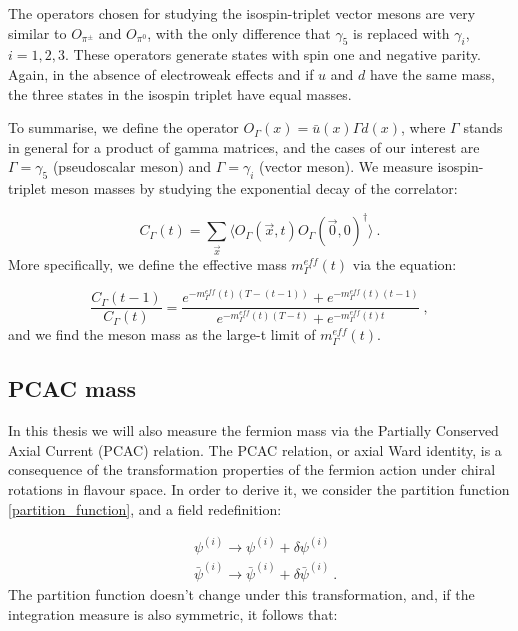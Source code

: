The operators chosen for studying the isospin-triplet vector mesons are very similar to $O_{\pi^{\pm}}$ and $O_{\pi^0}$, with the only difference that $\gamma_5$ is replaced with $\gamma_i$, $i = 1, 2, 3$. These operators generate states with spin one and negative parity. Again, in the absence of electroweak effects and if $u$ and $d$ have the same mass, the three states in the isospin triplet have equal masses.

To summarise, we define the operator $O_{\Gamma}(x) = \bar u(x) \Gamma d(x) $, where $\Gamma$ stands in general for a product of gamma matrices, and the cases of our interest are $\Gamma =\gamma_5$ (pseudoscalar meson) and $\Gamma = \gamma_i$ (vector meson). We measure isospin-triplet meson masses by studying the exponential decay of the correlator:

\begin{equation}
C_{\Gamma}(t) = \sum_{\vec x} \langle O_{\Gamma}(\vec x,t) O_{\Gamma} (\vec 0, 0)^{\dagger} \rangle \: .
\label{meson_correlator}
\end{equation}
%
More specifically, we define the effective mass $m^{eff}_{\Gamma}(t)$ via the equation:

\begin{equation}
\frac{C_{\Gamma}(t-1)}{C_{\Gamma}(t)} = \frac{e^{-m^{eff}_{\Gamma}(t)(T-(t-1))} + e^{-m^{eff}_{\Gamma}(t)(t-1)}}{e^{-m^{eff}_{\Gamma}(t)(T-t)} + e^{-m^{eff}_{\Gamma}(t)t}} \: ,
\label{eff_mass_mesons}
\end{equation}
%
and we find the meson mass as the large-t limit of $m^{eff}_{\Gamma}(t)$. 

\subsection{PCAC mass}

In this thesis we will also measure the fermion mass via the Partially Conserved Axial Current (PCAC) relation.
The PCAC relation, or axial Ward identity, is a consequence of the transformation properties of the fermion action under chiral rotations in flavour space. In order to derive it, we consider the partition function \ref{partition_function}, and a field redefinition:

\begin{equation}
\begin{split}
& \psi^{(i)} \to \psi^{(i)} + \delta \psi^{(i)} \\
& \bar \psi^{(i)} \to \bar \psi^{(i)} +  \delta \bar\psi^{(i)} \: .
\end{split}
\end{equation}
%
The partition function doesn't change under this transformation, and, if the integration measure is also symmetric, it follows that:

